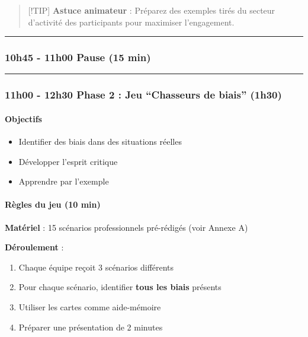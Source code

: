 \documentclass[
]{article}
\providecommand{\tightlist}{%
  \setlength{\itemsep}{0pt}\setlength{\parskip}{0pt}}
\begin{document}
\begin{quote}
{[}!TIP{]} \textbf{Astuce animateur} : Préparez des exemples tirés du
secteur d'activité des participants pour maximiser l'engagement.
\end{quote}

\begin{center}\rule{0.5\linewidth}{0.5pt}\end{center}

\subsubsection{\texorpdfstring{\textbf{10h45 - 11h00 \textbar{} Pause
(15
min)}}{10h45 - 11h00 \textbar{} Pause (15 min)}}\label{h45---11h00-pause-15-min}

\begin{center}\rule{0.5\linewidth}{0.5pt}\end{center}

\subsubsection{\texorpdfstring{\textbf{11h00 - 12h30 \textbar{} Phase 2
: Jeu ``Chasseurs de biais''
(1h30)}}{11h00 - 12h30 \textbar{} Phase 2 : Jeu ``Chasseurs de biais'' (1h30)}}\label{h00---12h30-phase-2-jeu-chasseurs-de-biais-1h30}

\paragraph{Objectifs}\label{objectifs-2}

\begin{itemize}
\tightlist
\item
  Identifier des biais dans des situations réelles
\item
  Développer l'esprit critique
\item
  Apprendre par l'exemple
\end{itemize}

\paragraph{Règles du jeu (10 min)}\label{ruxe8gles-du-jeu-10-min}

\textbf{Matériel} : 15 scénarios professionnels pré-rédigés (voir Annexe
A)

\textbf{Déroulement} :

\begin{enumerate}
\def\labelenumi{\arabic{enumi}.}
\tightlist
\item
  Chaque équipe reçoit 3 scénarios différents
\item
  Pour chaque scénario, identifier \textbf{tous les biais} présents
\item
  Utiliser les cartes comme aide-mémoire
\item
  Préparer une présentation de 2 minutes
\end{enumerate}
\end{document}
